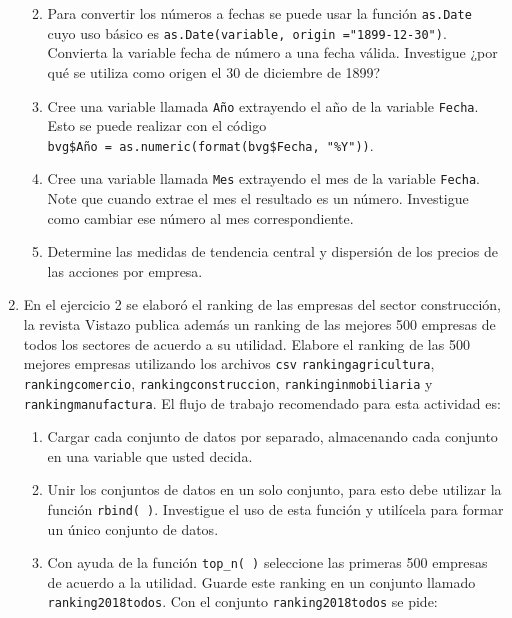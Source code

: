 \documentclass[
]{krantz}
\providecommand{\tightlist}{%
  \setlength{\itemsep}{0pt}\setlength{\parskip}{0pt}}
\begin{document}
\begin{enumerate}
  \begin{enumerate}
  \def\labelenumii{\alph{enumii}.}
  \tightlist
  \item
    Para convertir los números a fechas se puede usar la función \texttt{as.Date} cuyo uso básico es \texttt{as.Date(variable,\ origin\ ="1899-12-30")}. Convierta la variable fecha de número a una fecha válida. Investigue ¿por qué se utiliza como origen el 30 de diciembre de 1899?
  \item
    Cree una variable llamada \texttt{Año} extrayendo el año de la variable \texttt{Fecha}. Esto se puede realizar con el código \texttt{bvg\$Año\ =\ as.numeric(format(bvg\$Fecha,\ "\%Y"))}.
  \item
    Cree una variable llamada \texttt{Mes} extrayendo el mes de la variable \texttt{Fecha}. Note que cuando extrae el mes el resultado es un número. Investigue como cambiar ese número al mes correspondiente.
  \item
    Determine las medidas de tendencia central y dispersión de los precios de las acciones por empresa.
  \end{enumerate}
\item
  En el ejercicio 2 se elaboró el ranking de las empresas del sector construcción, la revista Vistazo publica además un ranking de las mejores 500 empresas de todos los sectores de acuerdo a su utilidad. Elabore el ranking de las 500 mejores empresas utilizando los archivos \texttt{csv} \texttt{rankingagricultura}, \texttt{rankingcomercio}, \texttt{rankingconstruccion}, \texttt{rankinginmobiliaria} y \texttt{rankingmanufactura}. El flujo de trabajo recomendado para esta actividad es:

  \begin{enumerate}
  \def\labelenumii{\alph{enumii}.}
  \tightlist
  \item
    Cargar cada conjunto de datos por separado, almacenando cada conjunto en una variable que usted decida.
  \item
    Unir los conjuntos de datos en un solo conjunto, para esto debe utilizar la función \texttt{rbind(\ )}. Investigue el uso de esta función y utilícela para formar un único conjunto de datos.
  \item
    Con ayuda de la función \texttt{top\_n(\ )} seleccione las primeras 500 empresas de acuerdo a la utilidad. Guarde este ranking en un conjunto llamado \texttt{ranking2018todos}. Con el conjunto \texttt{ranking2018todos} se pide:


\end{enumerate}
\end{enumerate}
\end{document}
